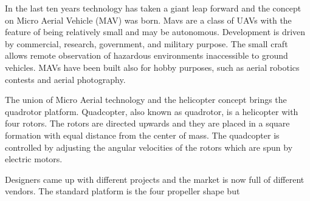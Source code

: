 \noindent
In the last ten years technology has taken a giant leap forward and the concept on Micro Aerial Vehicle (MAV) was born. Mavs are a class of UAVs with the feature of being relatively small and may be autonomous. Development is driven by commercial, research, government, and military purpose. The small craft allows remote observation of hazardous environments inaccessible to ground vehicles. MAVs have been built also for hobby purposes, such as aerial robotics contests and aerial photography.\par The union of Micro Aerial technology and the helicopter concept brings the quadrotor platform. Quadcopter, also known as quadrotor, is a helicopter with four rotors. The rotors are directed upwards and they are placed in a square formation with equal distance from the center of mass. The quadcopter is controlled by adjusting the angular velocities of the rotors which are spun by electric motors.\par Designers came up with different projects and the market is now full of different vendors. The standard platform is the four propeller shape but
